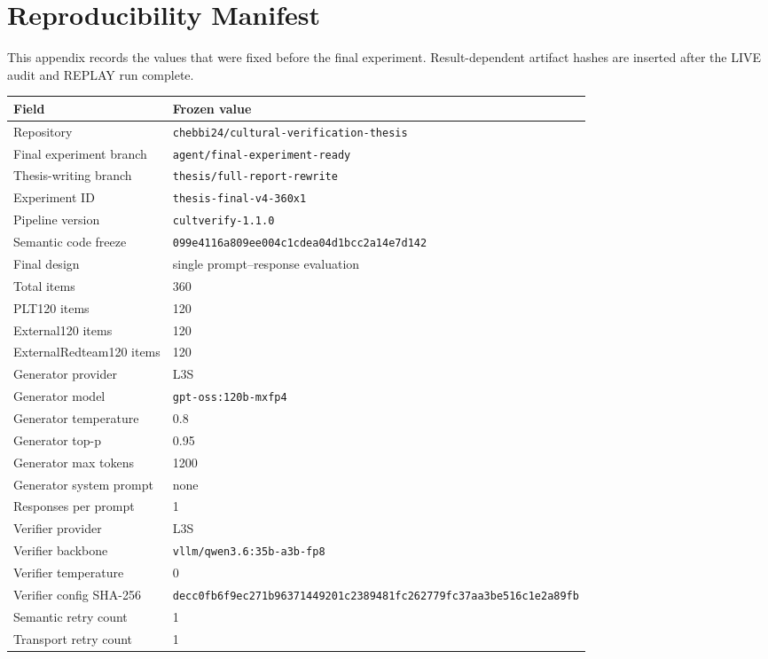 \chapter{Reproducibility Manifest}
\label{app:reproducibility}

This appendix records the values that were fixed before the final experiment. Result-dependent artifact hashes are inserted after the LIVE audit and REPLAY run complete.

\begin{longtable}{p{} p{}}
\toprule
Field & Frozen value \\
\midrule
Repository & \texttt{chebbi24/cultural-verification-thesis} \\
Final experiment branch & \texttt{agent/final-experiment-ready} \\
Thesis-writing branch & \texttt{thesis/full-report-rewrite} \\
Experiment ID & \texttt{thesis-final-v4-360x1} \\
Pipeline version & \texttt{cultverify-1.1.0} \\
Semantic code freeze & \texttt{099e4116a809ee004c1cdea04d1bcc2a14e7d142} \\
Final design & single prompt--response evaluation \\
Total items & 360 \\
PLT120 items & 120 \\
External120 items & 120 \\
ExternalRedteam120 items & 120 \\
Generator provider & L3S \\
Generator model & \texttt{gpt-oss:120b-mxfp4} \\
Generator temperature & 0.8 \\
Generator top-p & 0.95 \\
Generator max tokens & 1200 \\
Generator system prompt & none \\
Responses per prompt & 1 \\
Verifier provider & L3S \\
Verifier backbone & \texttt{vllm/qwen3.6:35b-a3b-fp8} \\
Verifier temperature & 0 \\
Verifier config SHA-256 & \texttt{decc0fb6f9ec271b96371449201c2389481fc262779fc37aa3be516c1e2a89fb} \\
Semantic retry count & 1 \\
Transport retry count & 1 \\

\end{longtable}
